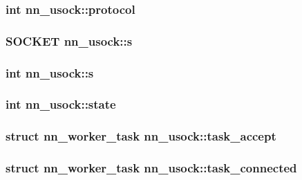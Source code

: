 \subsubsection[{protocol}]{\setlength{\rightskip}{0pt plus 5cm}int nn\+\_\+usock\+::protocol}\hypertarget{structnn__usock_a5d16683f021c46c67ed9687b11768df4}{}\label{structnn__usock_a5d16683f021c46c67ed9687b11768df4}
\subsubsection[{s}]{\setlength{\rightskip}{0pt plus 5cm}S\+O\+C\+K\+ET nn\+\_\+usock\+::s}\hypertarget{structnn__usock_a63a7149fe4ffae3b39c05bb6a9c0d11e}{}\label{structnn__usock_a63a7149fe4ffae3b39c05bb6a9c0d11e}
\subsubsection[{s}]{\setlength{\rightskip}{0pt plus 5cm}int nn\+\_\+usock\+::s}\hypertarget{structnn__usock_a1ac2b5e168dfe2692a4e311267d1b2da}{}\label{structnn__usock_a1ac2b5e168dfe2692a4e311267d1b2da}
\subsubsection[{state}]{\setlength{\rightskip}{0pt plus 5cm}int nn\+\_\+usock\+::state}\hypertarget{structnn__usock_a65e9e0f1508a46c242c190b86876097c}{}\label{structnn__usock_a65e9e0f1508a46c242c190b86876097c}
\subsubsection[{task\+\_\+accept}]{\setlength{\rightskip}{0pt plus 5cm}struct {\bf nn\+\_\+worker\+\_\+task} nn\+\_\+usock\+::task\+\_\+accept}\hypertarget{structnn__usock_a7d6bb9be8380d7ce5ab091681859d3b7}{}\label{structnn__usock_a7d6bb9be8380d7ce5ab091681859d3b7}
\subsubsection[{task\+\_\+connected}]{\setlength{\rightskip}{0pt plus 5cm}struct {\bf nn\+\_\+worker\+\_\+task} nn\+\_\+usock\+::task\+\_\+connected}\hypertarget{structnn__usock_a0d7d18551e25a476616ab10d60ce705e}{}\label{structnn__usock_a0d7d18551e25a476616ab10d60ce705e}
